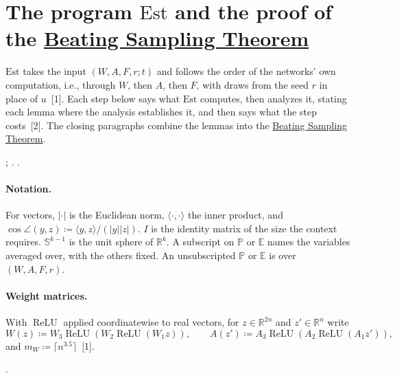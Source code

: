 \documentclass[10pt]{article}
\newcommand{\leanver}{v1.1}
\newcommand{\leanrepo}{https://github.com/andrewcritch/beating-sampling-theorem/tree/\leanver/lean/BstLean}
\newcommand{\leanmark}[1]{{\relscale{0.78}\color{gray}[#1]}}
\newenvironment{leanitems}{\par\smallskip\relscale{0.78}\color{gray}\hypersetup{urlcolor=gray}\raggedright%
  \begin{list}{}{\setlength{\leftmargin}{2em}\setlength{\labelwidth}{1.6em}%
  \setlength{\labelsep}{0.4em}\setlength{\itemsep}{0pt}\setlength{\topsep}{0pt}%
  \setlength{\parsep}{0pt}}}{\end{list}\par\medskip}
\newcommand{\bst}{\hyperref[thm:main]{Beating Sampling Theorem}}
\newcommand{\RR}{\mathbb{R}}
\newcommand{\SSS}{\mathbb{S}}\newcommand{\Kk}{\mathcal{K}}\newcommand{\Nn}{\mathcal{N}}\newcommand{\Bb}{\mathcal{B}}
\newcommand{\Est}{\mathrm{Est}}
\newcommand{\EE}{\mathbb{E}}
\newcommand{\PP}{\mathbb{P}}
\newcommand{\relu}{\operatorname{ReLU}}
\begin{document}
\section{The program $\Est$ and the proof of the \bst{}}\label{sec:program}

$\Est$ takes the input $(W,A,F,r;t)$ and follows the order of the networks'
own computation, i.e., through $W$, then $A$, then $F$, with draws from the seed $r$ in place of $u$~\leanmark{1}.
Each step below says what $\Est$ computes, then analyzes it, stating each
lemma where the analysis establishes it, and then says what the step
costs~\leanmark{2}. The closing paragraphs combine the lemmas into the \bst{}.
\begin{leanitems}
;
  \href{\leanrepo}{\leanstepB}.
.
\end{leanitems}

\paragraph{Notation.} For vectors, $|\cdot|$ is the Euclidean norm, $\langle\cdot,\cdot\rangle$
the inner product, and $\cos\angle(y,z)\coloneqq \langle y,z\rangle/(|y||z|)$. $I$ is
the identity matrix of the size the context requires. $\SSS^{k-1}$ is the
unit sphere of $\RR^k$. A subscript on $\PP$ or
$\EE$ names the variables averaged over, with the others fixed. An
unsubscripted $\PP$ or $\EE$ is over $(W,A,F,r)$.

\paragraph{Weight matrices.}
With $\relu$ applied coordinatewise to real vectors, for $z\in\RR^{2n}$ and $z'\in\RR^n$ write
\[W(z)\coloneqq W_3\relu(W_2\relu(W_1z)),\qquad A(z')\coloneqq A_3\relu(A_2\relu(A_1z')),\]
and $m_W\coloneqq \lceil n^{3.5}\rceil$~\leanmark{1}.
\begin{leanitems}
.
\end{leanitems}

\end{document}
